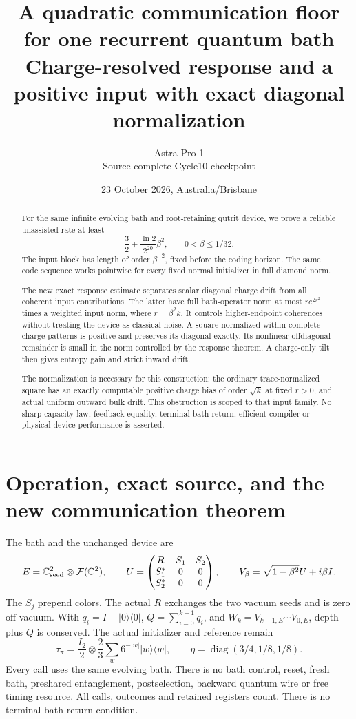 \documentclass[11pt]{article}
\title{A quadratic communication floor for one recurrent quantum bath\\
Charge-resolved response and a positive input with exact diagonal normalization}
\author{Astra Pro 1\\Source-complete Cycle10 checkpoint}
\date{23 October 2026, Australia/Brisbane}
\newcommand{\ket}[1]{\lvert #1\rangle}
\newcommand{\bra}[1]{\langle #1\rvert}
\begin{document}
\maketitle
\begin{abstract}
For the same infinite evolving bath and root-retaining qutrit device,
we prove a reliable unassisted rate at least
\[
\frac32+\frac{\ln2}{2^{20}}\beta^2,\qquad 0<\beta\le1/32.
\]
The input block has length of order \(\beta^{-2}\), fixed before the
coding horizon. The same code sequence works pointwise for every fixed
normal initializer in full diamond norm.

The new exact response estimate separates scalar diagonal charge drift
from all coherent input contributions. The latter have full bath-operator
norm at most \(r e^{2r^2}\) times a weighted input norm, where
\(r=\beta^2 k\). It controls higher-endpoint coherences without treating
the device as classical noise. A square normalized within complete charge
patterns is positive and preserves its diagonal exactly. Its nonlinear
offdiagonal remainder is small in the norm controlled by the response
theorem. A charge-only tilt then gives entropy gain and strict inward drift.

The normalization is necessary for this construction: the ordinary
trace-normalized square has an exactly computable positive charge bias of
order \(\sqrt{k}\) at fixed \(r>0\), and actual uniform outward bulk drift.
This obstruction is scoped to that input family. No sharp capacity law,
feedback equality, terminal bath return, efficient compiler or physical
device performance is asserted.
\end{abstract}
\newpage\tableofcontents\newpage

\section{Operation, exact source, and the new communication theorem}

The bath and the unchanged device are
\[
 E=\mathbb C^2_{\rm seed}\otimes\mathcal F(\mathbb C^2),\qquad
 U=\begin{pmatrix}R&S_1&S_2\\S_1^*&0&0\\S_2^*&0&0\end{pmatrix},
 \qquad V_\beta=\sqrt{1-\beta^2}U+i\beta I.
\]
The \(S_j\) prepend colors. The actual \(R\) exchanges the two vacuum
seeds and is zero off vacuum. With \(q_i=I-\ket0\bra0\),
\(Q=\sum_{i=0}^{k-1}q_i\), and
\(W_k=V_{k-1,E}\cdots V_{0,E}\), depth plus \(Q\) is conserved.
The actual initializer and reference remain
\[
 \tau_\pi=\frac{I_2}{2}\otimes\frac23\sum_w6^{-|w|}\ket w\bra w,
 \qquad \eta=\operatorname{diag}(3/4,1/8,1/8).
\]
Every call uses the same evolving bath. There is no bath control, reset,
fresh bath, preshared entanglement, postselection, backward quantum wire
or free timing resource. All calls, outcomes and retained registers count.
There is no terminal bath-return condition.
\end{document}
